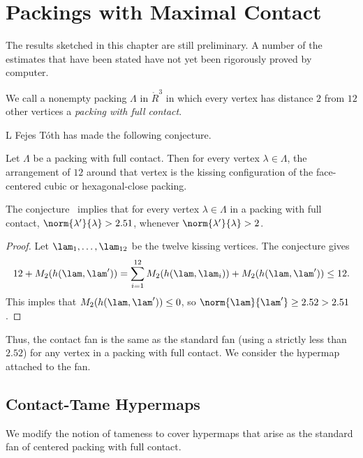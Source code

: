 
\chapter{Packings with Maximal Contact}

\begin{note}%
The results sketched in this chapter are still preliminary.  A number of the estimates that have been stated have not yet been rigorously proved by computer. 
\end{note}

We call a nonempty packing $\Lambda$ in $\ring{R}^3$ in which every vertex has distance $2$ from  $12$ other vertices a {\it packing with full contact}.

L Fejes T\'oth has made the following conjecture.

\begin{conjecture}  Let $\Lambda$ be a packing with full contact.  Then for every vertex $\lambda\in\Lambda$, the arrangement of $12$ around that vertex is the kissing configuration of the face-centered cubic or hexagonal-close packing. 
\end{conjecture}



\begin{lemma}  The conjecture~\label{conj:m2} implies that for every vertex $\lambda\in\Lambda$ in a packing with full contact, $\norm{\lambda'}{\lambda}> 2.51$, whenever $\norm{\lambda'}{\lambda}> 2$.
\end{lemma}

\begin{proof} Let $\lam_1,\ldots,\lam_{12}$ be the twelve kissing vertices.  The conjecture gives
$$
12 + M_2(h(\lam,\lam')) = \sum_{i=1}^{12} M_2(h(\lam,\lam_i)) + M_2(h(\lam,\lam')) \le 12.
$$
This imples that $M_2(h(\lam,\lam'))\le 0$, so $\norm{\lam}{\lam'}\ge 2.52 > 2.51$.
\end{proof}

Thus, the contact fan is the same as the standard fan (using a strictly less than $2.52$) for any vertex in a packing with full contact.  We consider the hypermap attached to the fan.


\section{Contact-Tame Hypermaps}

We modify the notion of tameness to cover hypermaps that arise as the standard fan of centered packing with full contact.  

